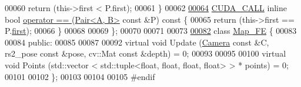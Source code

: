 \begin{DoxyCode}
00060         \textcolor{keywordflow}{return} (this->first < P.first);
00061     \}
00062 
\hypertarget{Helper_8hpp_source.tex_l00064}{}\hyperlink{classPair_a8e382aa87f8063084ecea74136a35ace}{00064}     \hyperlink{Helper_8hpp_a0029886fd5e151820efb6eb46c000466}{CUDA\_CALL} \textcolor{keyword}{inline} \textcolor{keywordtype}{bool} \hyperlink{classPair_a8e382aa87f8063084ecea74136a35ace}{operator == }(\hyperlink{classPair}{Pair<A, B>} \textcolor{keyword}{const} &P)\textcolor{keyword}{ const }\{
00065         \textcolor{keywordflow}{return} (this->first == P.\hyperlink{classPair_a98924311a2986df358d3b1965f8abd06}{first});
00066     \}
00068 
00069 \};
00070 
00071 
00073 
\hypertarget{Helper_8hpp_source.tex_l00082}{}\hyperlink{classMap__FE}{00082} \textcolor{keyword}{class }\hyperlink{classMap__FE}{Map\_FE} \{
00083 
00084 \textcolor{keyword}{public}:
00085 
00087 
00092     \textcolor{keyword}{virtual} \textcolor{keywordtype}{void} Update (\hyperlink{classCamera}{Camera} \textcolor{keyword}{const} &C, rs2\_pose \textcolor{keyword}{const} &pose, cv::Mat \textcolor{keyword}{const} &depth) = 0;
00093 
00095 
00100     \textcolor{keyword}{virtual} \textcolor{keywordtype}{void} Points (std::vector < std::tuple<float, float, float, float> > * points) = 0;
00101 
00102 \};
00103 
00104 
00105 \textcolor{preprocessor}{#endif}
\end{DoxyCode}
